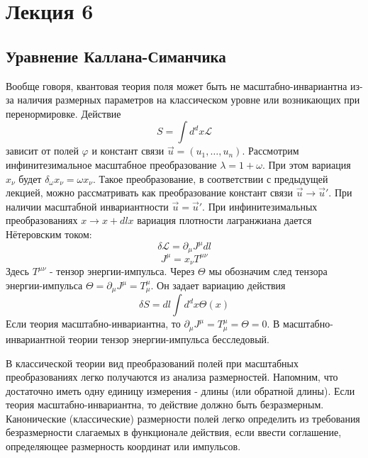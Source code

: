 \documentclass[a4paper,12pt]{article}
\theoremstyle{definition}
\theoremstyle{definition}
\theoremstyle{definition}
\begin{document}
\section{Лекция 6 }
\label{sec:lecture-4}
\subsection{Уравнение Каллана-Симанчика}

Вообще говоря, квантовая теория поля может быть не масштабно-инвариантна из-за наличия размерных параметров на классическом уровне или возникающих при перенормировке. Действие
\begin{equation}
  \label{eq:73}
  S=\int d^dx \mathcal{L}
\end{equation}
зависит от полей $\varphi$ и констант связи $\vec u=(u_1,\dots,u_n)$. Рассмотрим инфинитезимальное масштабное преобразование $\lambda=1+\omega$. При этом вариация $x_{\nu}$ будет $\delta_{\omega}x_{\nu}=\omega x_{\nu}$. Такое преобразование, в соответствии с предыдущей лекцией,  можно рассматривать как преобразование констант связи $\vec u\to \vec u'$. При наличии масштабной инвариантности $\vec u = \vec u'$. При инфинитезимальных преобразованиях $x\to x+dl x$ вариация плотности лагранжиана дается Нётеровским током:
\begin{equation}
  \label{eq:74}
  \delta\mathcal{L}=\partial_{\mu}J^{\mu}dl
\end{equation}
\begin{equation}
  \label{eq:75}
  J^{\mu}=x_{\nu}T^{\mu\nu}
\end{equation}
Здесь $T^{\mu\nu}$ - тензор энергии-импульса.  Через $\Theta$ мы обозначим след тензора энергии-импульса $\Theta=\partial_{\mu}J^{\mu}=T_{\mu}^{\mu}$. Он задает вариацию действия
\begin{equation}
  \label{eq:87}
  \delta S=dl \int d^d x \Theta(x)
\end{equation}
Если теория масштабно-инвариантна, то $\partial_{\mu}J^{\mu}=T_{\mu}^{\mu}=\Theta=0$. В масштабно-инвариантной теории тензор энергии-импульса бесследовый.

В классической теории вид преобразований полей при масштабных преобразованиях легко получаются из анализа размерностей. Напомним, что достаточно иметь одну единицу измерения - длины (или обратной длины). Если теория масштабно-инвариантна, то действие должно быть безразмерным. Канонические (классические) размерности полей легко определить из требования безразмерности слагаемых в функционале действия, если ввести соглашение, определяющее размерность координат или импульсов.
\end{document}
